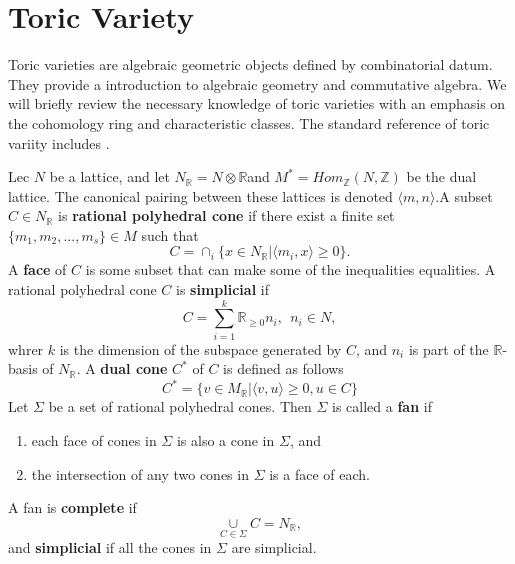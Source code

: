 \documentclass[11pt]{article}
\begin{document}
\section{Toric Variety}
Toric varieties are algebraic geometric objects defined by combinatorial datum. They provide a introduction to algebraic geometry and commutative algebra. We will briefly review the necessary knowledge of toric varieties with an emphasis on the cohomology ring and characteristic classes. The standard reference of toric variity includes \cite{ewald2012combinatorial,cox2009toric}. 

Lec $N$ be a lattice, and let $N_\mathbb{R}=N\otimes\mathbb{R}$and  $M^*=Hom_{\mathbb{Z}}(N,\mathbb{Z})$ be the dual lattice. The canonical pairing between these lattices is denoted $\langle m, n\rangle$.A subset $C\in N_\mathbb{R}$ is \textbf{rational polyhedral cone} if there exist a finite set $\{m_1, m_2,..., m_s\}\in M$ such that
\begin{equation*}
C=\cap_i \{x\in N_\mathbb{R}| \langle m_i, x\rangle \geq 0\}.
\end{equation*}
A \textbf{face} of $C$ is some subset that can make some of the inequalities equalities. A rational polyhedral cone $C$ is \textbf{simplicial} if 
$$
C=\sum_{i=1}^{k}\mathbb{R}_{\geq0} n_i, \ \ n_i\in N,
$$
whrer $k$ is the dimension of the subspace generated by $C$, and ${n_i}$ is part of the $\mathbb{R}$-basis of $N_{\mathbb{R}}$.
A \textbf{dual cone} $C^*$ of $C$ is defined as follows
\begin{equation*}
C^*=\{v\in M_\mathbb{R}|\langle v,u\rangle\geq0, u\in C\}
\end{equation*}
Let $\Sigma$ be a set of rational polyhedral cones. Then $\Sigma$ is called a \textbf{fan} if 
\begin{enumerate}
\item each face of cones in $\Sigma$ is also a cone in $\Sigma$, and
\item the intersection of any two cones in $\Sigma$ is a face of each.
\end{enumerate}
A fan is \textbf{complete} if
\begin{equation*}
\underset{C\in\Sigma}{\cup}C=N_\mathbb{R},
\end{equation*}
and \textbf{simplicial} if all the cones in $\Sigma$ are simplicial. 
\end{document}
